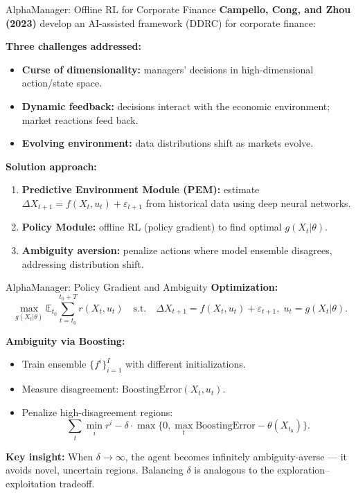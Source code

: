 \documentclass[10pt,english,aspectratio=169]{beamer}
\begin{document}
\begin{frame}{AlphaManager: Offline RL for Corporate Finance}
\textbf{Campello, Cong, and Zhou (2023)} develop an AI-assisted framework (DDRC) for corporate finance:

\vspace{0.3cm}
\textbf{Three challenges addressed:}
\begin{itemize}
    \item \textbf{Curse of dimensionality:} managers' decisions in high-dimensional action/state space.
    \item \textbf{Dynamic feedback:} decisions interact with the economic environment; market reactions feed back.
    \item \textbf{Evolving environment:} data distributions shift as markets evolve.
\end{itemize}

\vspace{0.3cm}
\textbf{Solution approach:}
\begin{enumerate}
    \item \textbf{Predictive Environment Module (PEM):} estimate $\Delta X_{t+1} = f(X_t, u_t) + \varepsilon_{t+1}$ from historical data using deep neural networks.
    \item \textbf{Policy Module:} offline RL (policy gradient) to find optimal $g(X_t|\theta)$.
    \item \textbf{Ambiguity aversion:} penalize actions where model ensemble disagrees, addressing distribution shift.
\end{enumerate}
\end{frame}

\begin{frame}{AlphaManager: Policy Gradient and Ambiguity}
\textbf{Optimization:}
\[
\max_{g(X_t|\theta)} \mathbb{E}_{t_0}\sum_{t=t_0}^{t_0+T} r(X_t, u_t)
\quad \text{s.t.} \quad
\Delta X_{t+1} = f(X_t, u_t) + \varepsilon_{t+1},\; u_t = g(X_t|\theta).
\]

\vspace{0.2cm}
\textbf{Ambiguity via Boosting:}
\begin{itemize}
    \item Train ensemble $\{f^i\}_{i=1}^I$ with different initializations.
    \item Measure disagreement: $\text{BoostingError}(X_t, u_t)$.
    \item Penalize high-disagreement regions:
    \[
    \sum_t \min_i r^i - \delta \cdot \max\{0, \max_t \text{BoostingError} - \theta(X_{t_0})\}.
    \]
\end{itemize}

\vspace{0.2cm}
\textbf{Key insight:} When $\delta \to \infty$, the agent becomes infinitely ambiguity-averse --- it avoids novel, uncertain regions. Balancing $\delta$ is analogous to the exploration--exploitation tradeoff.
\end{frame}
\end{document}
